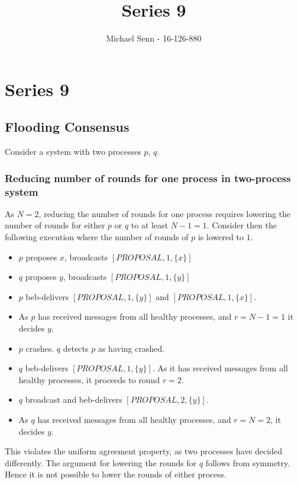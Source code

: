 \documentclass[a4paper]{scrreprt}
\title{Series 9}
\author{Michael Senn \maillink{michael.senn@students.unibe.ch} - 16-126-880}
\date{\printdate}
\begin{document}
\maketitle


\setcounter{chapter}{8}

\chapter{Series 9}

\section{Flooding Consensus}

Consider a system with two processes $p$, $q$.

\subsection{Reducing number of rounds for one process in two-process system}

As $N = 2$, reducing the number of rounds for one process requires lowering the
number of rounds for either $p$ or $q$ to at least $N - 1 = 1$. Consider then
the following execution where the number of rounds of $p$ is lowered to $1$.

\begin{itemize}
	\item $p$ proposes $x$, broadcasts $[PROPOSAL, 1, \{x\}]$
	\item $q$ proposes $y$, broadcasts $[PROPOSAL, 1, \{y\}]$
	\item $p$ beb-delivers $[PROPOSAL, 1, \{y\}]$ and $[PROPOSAL, 1,
		\{x\}]$.
	\item As $p$ has received messages from all healthy processes, and $r =
		N - 1 = 1$ it decides $y$.
	\item $p$ crashes. $q$ detects $p$ as having crashed.
	\item $q$ beb-delivers $[PROPOSAL, 1, \{y\}]$. As it has received
		messages from all healthy processes, it proceeds to round $r =
		2$.
	\item $q$ broadcast and beb-delivers $[PROPOSAL, 2, \{y\}]$.
	\item As $q$ has received messages from all healthy processes, and $r =
		N = 2$, it decides $y$.
\end{itemize}

This violates the uniform agreement property, as two processes have decided
differently. The argument for lowering the rounds for $q$ follows from
symmetry. Hence it is not possible to lower the rounds of either process.
\end{document}

